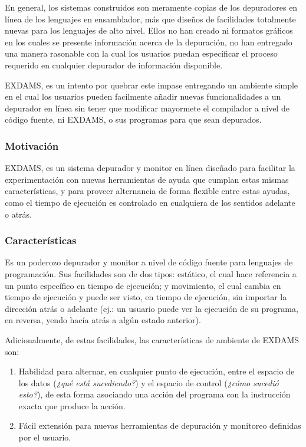 \documentclass[12pt,legalpaper]{report}
\begin{document}
En general, los sistemas construidos son meramente copias de los depuradores en línea de los lenguajes en ensamblador, más que diseños de facilidades totalmente nuevas para los lenguajes de alto nivel.  Ellos no han creado ni formatos gráficos en los cuales se presente información acerca de la depuración, no han entregado una manera rasonable con la cual los usuarios puedan especificar el proceso requerido en cualquier depurador de información disponible.

EXDAMS, es un intento por quebrar este impase entregando un ambiente simple en el cual los usuarios pueden facilmente añadir nuevas funcionalidades a un depurador en línea sin tener que modificar mayormete el compilador a nivel de código fuente, ni EXDAMS, o sus programas para que sean depurados.


			\subsubsection{Motivación}

EXDAMS, es un sistema depurador y monitor en línea diseñado para facilitar la experimentación con nuevas herramientas de ayuda que cumplan estas mismas características, y para proveer alternancia de forma flexible entre estas ayudas, como el tiempo de ejecución es controlado en cualquiera de los sentidos adelante o atrás.

			\subsubsection{Características}

Es un poderozo depurador y monitor a nivel de código fuente para lenguajes de programación.  Sus facilidades son de dos tipos: estático, el cual hace referencia a un punto específico en tiempo de ejecución; y movimiento, el cual cambia en tiempo de ejecución y puede ser visto, en tiempo de ejecución, sin importar la dirección atrás o adelante (ej.: un usuario puede ver la ejecución de su programa, en reversa, yendo hacía atrás a algún estado anterior).

Adicionalmente, de estas facilidades, las características de ambiente de EXDAMS son:
\begin{enumerate}
	\item Habilidad para alternar, en cualquier punto de ejecución, entre el espacio de los datos (\textit{¿qué está sucediendo?}) y el espacio de control (\textit{¿cómo sucedió esto?}), de esta forma asociando una acción del programa con la instrucción exacta que produce la acción.

	\item Fácil extensión para nuevas herramientas de depuración y monitoreo definidas por el usuario.
\end{enumerate} 
\end{document}
